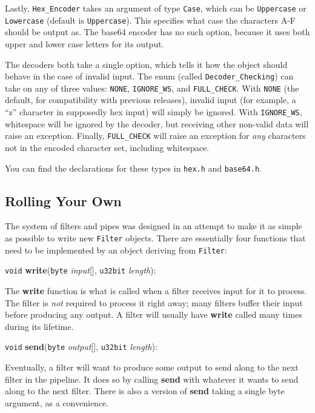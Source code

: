 \documentclass{article}
\newcommand{\filename}[1]{\texttt{#1}}
\newcommand{\function}[1]{\textbf{#1}}
\newcommand{\type}[1]{\texttt{#1}}
\renewcommand{\arg}[1]{\textsl{#1}}
\begin{document}
Lastly, \type{Hex\_Encoder} takes an argument of type \type{Case}, which can be
\type{Uppercase} or \type{Lowercase} (default is \type{Uppercase}). This
specifies what case the characters A-F should be output as. The base64 encoder
has no such option, because it uses both upper and lower case letters for its
output.

The decoders both take a single option, which tells it how the object should
behave in the case of invalid input. The enum (called \type{Decoder\_Checking})
can take on any of three values: \type{NONE}, \type{IGNORE\_WS}, and
\type{FULL\_CHECK}. With \type{NONE} (the default, for compatibility with
previous releases), invalid input (for example, a ``z'' character in supposedly
hex input) will simply be ignored. With \type{IGNORE\_WS}, whitespace will be
ignored by the decoder, but receiving other non-valid data will raise an
exception. Finally, \type{FULL\_CHECK} will raise an exception for \emph{any}
characters not in the encoded character set, including whitespace.

You can find the declarations for these types in \filename{hex.h} and
\filename{base64.h}.

\subsection{Rolling Your Own}

The system of filters and pipes was designed in an attempt to make it
as simple as possible to write new \type{Filter} objects. There are
essentially four functions that need to be implemented by an object
deriving from \type{Filter}:

\noindent
\type{void} \function{write}(\type{byte} \arg{input}[], \type{u32bit}
\arg{length}):

The \function{write} function is what is called when a filter receives input
for it to process. The filter is \emph{not} required to process it right away;
many filters buffer their input before producing any output. A filter will
usually have \function{write} called many times during its lifetime.

\noindent
\type{void} \function{send}(\type{byte} \arg{output}[], \type{u32bit}
\arg{length}):

Eventually, a filter will want to produce some output to send along to the next
filter in the pipeline. It does so by calling \function{send} with whatever it
wants to send along to the next filter. There is also a version of
\function{send} taking a single byte argument, as a convenience.
\end{document}

